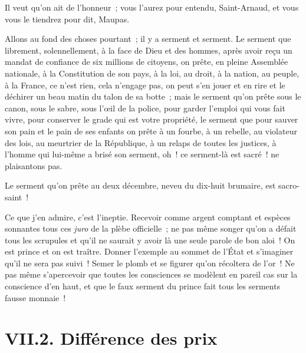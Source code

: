 \documentclass[french,twoside]{book} %
\begin{document}
Il veut qu’on ait de l’honneur ; vous l’aurez pour entendu, Saint-Arnaud, et vous vous le tiendrez pour dit, Maupas.\par
Allons au fond des choses pourtant ; il y a serment et serment. Le serment que librement, solennellement, à la face de Dieu et des hommes, après avoir reçu un mandat de confiance de six millions de citoyens, on prête, en pleine Assemblée nationale, à la Constitution de son pays, à la loi, au droit, à la nation, au peuple, à la France, ce n’est rien, cela n’engage pas, on peut s’en jouer et en rire et le déchirer un beau matin du talon de sa botte ; mais le serment qu’on prête sous le canon, sous le sabre, sous l’œil de la police, pour garder l’emploi qui vous fait vivre, pour conserver le grade qui est votre propriété, le serment que pour sauver son pain et le pain de ses enfants on prête à un fourbe, à un rebelle, au violateur des lois, au meurtrier de la République, à un relaps de toutes les justices, à l’homme qui lui-même a brisé son serment, oh ! ce serment-là est sacré ! ne plaisantons pas.\par
Le serment qu’on prête au deux décembre, neveu du dix-huit brumaire, est sacro-saint !\par
Ce que j’en admire, c’est l’ineptie. Recevoir comme argent comptant et espèces sonnantes tous ces \emph{juro} de la plèbe officielle ; ne pas même songer qu’on a défait tous les scrupules et qu’il ne saurait y avoir là une seule parole de bon aloi ! On est prince et on est traître. Donner l’exemple au sommet de l’État et s’imaginer qu’il ne sera pas suivi ! Semer le plomb et se figurer qu’on récoltera de l’or ! Ne pas même s’apercevoir que toutes les consciences se modèlent en pareil cas sur la conscience d’en haut, et que le faux serment du prince fait tous les serments fausse monnaie !

\section[{VII.2. Différence des prix}]{VII.2. Différence des prix}
\end{document}
